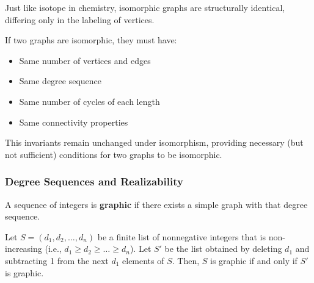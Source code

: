 Just like isotope in chemistry, isomorphic graphs are structurally identical, differing only in the labeling of vertices.

\begin{theorem}
If two graphs are isomorphic, they must have:
\begin{itemize}
    \item Same number of vertices and edges
    \item Same degree sequence
    \item Same number of cycles of each length
    \item Same connectivity properties
\end{itemize}
\end{theorem}

This invariants remain unchanged under isomorphism, providing necessary (but not sufficient) conditions for two graphs to be isomorphic.

\subsubsection{Degree Sequences and Realizability}
A sequence of integers is \textbf{graphic} if there exists a simple graph with that degree sequence.

\begin{theorem}
Let $S = (d_1, d_2, \dots, d_n)$ be a finite list of nonnegative integers that is non-increasing (i.e., $d_1 \ge d_2 \ge \dots \ge d_n$). Let $S'$ be the list obtained by deleting $d_1$ and subtracting 1 from the next $d_1$ elements of $S$. Then, $S$ is graphic if and only if $S'$ is graphic.
\end{theorem}

